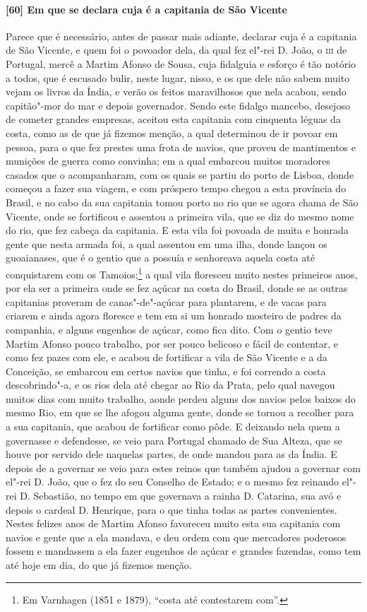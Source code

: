 \begin{linenumbers}
\paragraph{[60] Em que se declara cuja é a capitania de São Vicente} \quad
Parece que é necessário, antes de passar mais adiante, declarar cuja é a capitania de São
Vicente, e quem foi o povoador dela, da qual fez el"-rei D. João, o \textsc{iii} de
Portugal, mercê a Martim Afonso de Sousa, cuja fidalguia e esforço é tão notório a todos,
que é escusado bulir, neste lugar, nisso, e os que dele não sabem muito vejam os livros da
Índia, e verão os feitos maravilhosos que nela acabou, sendo capitão"-mor do mar e depois
governador. Sendo este fidalgo mancebo, desejoso de cometer grandes empresas, aceitou esta
capitania com cinquenta léguas da costa, como as de que já fizemos menção, a qual
determinou de ir povoar em pessoa, para o que fez prestes uma frota de navios, que proveu
de mantimentos e munições de guerra como convinha; em a qual embarcou muitos moradores
casados que o acompanharam, com os quais se partiu do porto de Lisboa, donde começou a
fazer sua viagem, e com próspero tempo chegou a esta província do Brasil, e no cabo da sua
capitania tomou porto no rio que se agora chama de São Vicente, onde se fortificou e
assentou a primeira vila, que se diz do mesmo nome do rio, que fez cabeça da capitania. E
esta vila foi povoada de muita e honrada gente que nesta armada foi, a qual assentou em
uma ilha, donde lançou os guoaianases, que é o gentio que a possuía e senhoreava aquela
costa até conquistarem com os Tamoios;\footnote{ Em Varnhagen (1851 e 1879), ``costa até
contestarem com''.} a qual vila floresceu muito nestes primeiros anos, por ela ser a
primeira onde se fez açúcar na costa do Brasil, donde se as outras capitanias proveram de
canas"-de"-açúcar para plantarem, e de vacas para criarem e ainda agora floresce e tem em si
um honrado mosteiro de padres da companhia, e alguns engenhos de açúcar, como fica dito.
Com o gentio teve Martim Afonso pouco trabalho, por ser pouco belicoso e fácil de
contentar, e como fez pazes com ele, e acabou de fortificar a vila de São Vicente e a da
Conceição, se embarcou em certos navios que tinha, e foi correndo a costa descobrindo"-a, e
os rios dela até chegar ao Rio da Prata, pelo qual navegou muitos dias com muito trabalho,
aonde perdeu alguns dos navios pelos baixos do mesmo Rio, em que se lhe afogou alguma
gente, donde se tornou a recolher para a sua capitania, que acabou de fortificar como
pôde. E deixando nela quem a governasse e defendesse, se veio para Portugal chamado de Sua
Alteza, que se houve por servido dele naquelas partes, de onde mandou para as da Índia. E
depois de a governar se veio para estes reinos que também ajudou a governar com el"-rei D.
João, que o fez do seu Conselho de Estado; e o mesmo fez reinando el"-rei D. Sebastião, no
tempo em que governava a rainha D. Catarina, sua avó e depois o cardeal D. Henrique, para
o que tinha todas as partes convenientes. Nestes felizes anos de Martim Afonso favoreceu
muito esta sua capitania com navios e gente que a ela mandava, e deu ordem com que
mercadores poderosos fossem e mandassem a ela fazer engenhos de açúcar e grandes fazendas,
como tem até hoje em dia, do que já fizemos menção.


\end{linenumbers}
